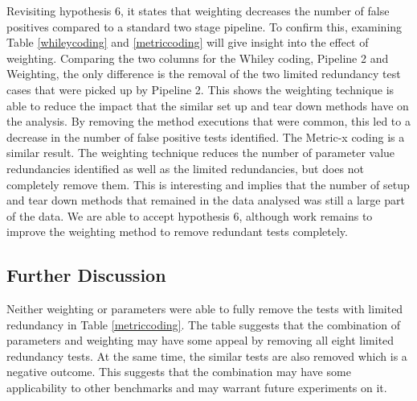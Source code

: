 Revisiting hypothesis 6, it states that weighting decreases the number of false positives compared to a standard two stage pipeline. To confirm this, examining Table \ref{whileycoding} and \ref{metriccoding} will give insight into the effect of weighting. Comparing the two columns for the Whiley coding, Pipeline 2 and Weighting, the only difference is the removal of the two limited redundancy test cases that were picked up by Pipeline 2. This shows the weighting technique is able to reduce the impact that the similar set up and tear down methods have on the analysis. By removing the method executions that were common, this led to a decrease in the number of false positive tests identified. The Metric-x coding is a similar result. The weighting technique reduces the number of parameter value redundancies identified as well as the limited redundancies, but does not completely remove them. This is interesting and implies that the number of setup and tear down methods that remained in the data analysed was still a large part of the data. We are able to accept hypothesis 6, although work remains to improve the weighting method to remove redundant tests completely.

\subsection{Further Discussion}

Neither weighting or parameters were able to fully remove the tests with limited redundancy in Table \ref{metriccoding}. The table suggests that the combination of parameters and weighting may have some appeal by removing all eight limited redundancy tests. At the same time, the similar tests are also removed which is a negative outcome. This suggests that the combination may have some applicability to other benchmarks and may warrant future experiments on it.


